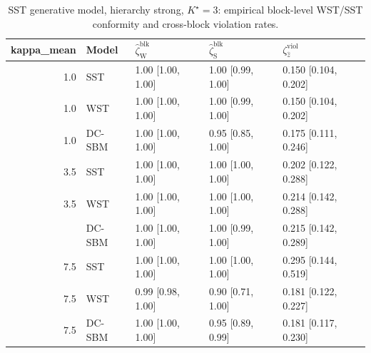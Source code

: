 \begin{table}
\centering
\caption{SST generative model, hierarchy strong, $K^\star=3$: empirical block-level WST/SST conformity and cross-block violation rates.}
\centering
\begin{tabular}[t]{rllll}
\toprule
kappa_mean & Model & $\widehat\zeta_{\mathrm{W}}^{\mathrm{blk}}$ & $\widehat\zeta_{\mathrm{S}}^{\mathrm{blk}}$ & $\zeta^{\mathrm{viol}}_{\hat z}$\\
\midrule
1.0 & SST & 1.00 [1.00, 1.00] & 1.00 [0.99, 1.00] & 0.150 [0.104, 0.202]\\
1.0 & WST & 1.00 [1.00, 1.00] & 1.00 [0.99, 1.00] & 0.150 [0.104, 0.202]\\
1.0 & DC-SBM & 1.00 [1.00, 1.00] & 0.95 [0.85, 1.00] & 0.175 [0.111, 0.246]\\
3.5 & SST & 1.00 [1.00, 1.00] & 1.00 [1.00, 1.00] & 0.202 [0.122, 0.288]\\
3.5 & WST & 1.00 [1.00, 1.00] & 1.00 [1.00, 1.00] & 0.214 [0.142, 0.288]\\
\addlinespace
3.5 & DC-SBM & 1.00 [1.00, 1.00] & 1.00 [0.99, 1.00] & 0.215 [0.142, 0.289]\\
7.5 & SST & 1.00 [1.00, 1.00] & 1.00 [1.00, 1.00] & 0.295 [0.144, 0.519]\\
7.5 & WST & 0.99 [0.98, 1.00] & 0.90 [0.71, 1.00] & 0.181 [0.122, 0.227]\\
7.5 & DC-SBM & 1.00 [1.00, 1.00] & 0.95 [0.89, 0.99] & 0.181 [0.117, 0.230]\\
\bottomrule
\end{tabular}
\end{table}
